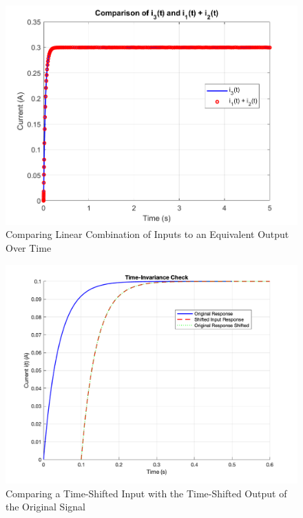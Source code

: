 \documentclass[12pt]{article}
\begin{document}
\begin{enumerate}
\begin{enumerate}
    \begin{figure}[H]
      \centering
      \includegraphics[width=\textwidth]{Figures/figure34.png}
      \caption{Comparing Linear Combination of Inputs to an Equivalent Output Over Time}
      \label{fig:figure34a}
    \end{figure}

    \begin{figure}[H]
      \centering
      \includegraphics[width=\textwidth]{Figures/figure35.png}
      \caption{Comparing a Time-Shifted Input with the Time-Shifted Output of the Original Signal}
      \label{fig:figure34b}
    \end{figure}

  \end{enumerate}
\newpage


\end{enumerate}
\end{document}
